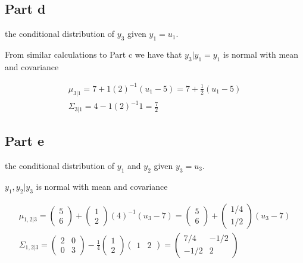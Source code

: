 \documentclass{article}
\begin{document}
\subsection*{Part d}

the conditional distribution of $y_3$ given $y_1=u_1$.

From similar calculations to Part c we have that $y_3|y_1=y_1$ is normal with mean and covariance

\begin{gather*}
\mu_{3|1} = 7 + 1(2)^{-1}(u_1-5) = 7 + \frac{1}{2}(u_1-5) \\
\Sigma_{3|1} = 4-1(2)^{-1}1 = \frac{7}{2}
\end{gather*}

\subsection*{Part e}

the conditional distribution of $y_1$ and $y_2$ given $y_3 = u_3$.

$y_1, y_2|y_3$ is normal with mean and covariance

\begin{gather*}
\mu_{1,2|3} = \begin{pmatrix}
5 \\ 6
\end{pmatrix} +
\begin{pmatrix}
1 \\ 2
\end{pmatrix}
(4)^{-1}(u_3-7)
= \begin{pmatrix}5 \\ 6\end{pmatrix}
+\begin{pmatrix}
1/4 \\ 1/2
\end{pmatrix}(u_3-7)\\
\Sigma_{1,2|3} = \begin{pmatrix}
2&0\\
0&3
\end{pmatrix} -
\frac{1}{4}
\begin{pmatrix}
1 \\ 2
\end{pmatrix}
\begin{pmatrix}
1 & 2
\end{pmatrix} =
\begin{pmatrix}
7/4 & -1/2 \\
-1/2 & 2
\end{pmatrix}
\end{gather*}
\end{document}
